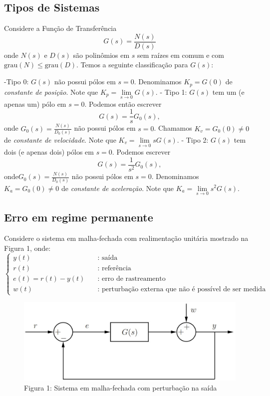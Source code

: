 \documentclass[
]{book}
\begin{document}
\hypertarget{tipos-de-sistemas}{%
\subsection{Tipos de Sistemas}\label{tipos-de-sistemas}}

Considere a Função de Transferência
\[
G(s) = \frac {N(s)}{D(s)}
\]
onde \(N(s)\) e \(D(s)\) são polinômios em \(s\) sem raízes em comum e com \(\text{grau}(N) \leq \text{grau}(D)\). Temos a seguinte classificação para \(G(s)\):

-Tipo 0: \(G(s)\) não possui pólos em \(s=0\). Denominamos \(K_p = G(0)\) de \emph{constante de posição}. Note que \(K_p = \lim\limits_{s \to 0} G(s)\).
- Tipo 1: \(G(s)\) tem um (e apenas um) pólo em \(s=0\). Podemos então escrever
\[
G(s) = \frac {1}{s}G_0(s),
\]
onde \(G_0(s) = \frac {N(s)}{D_0(s)}\) não possui pólos em \(s=0\). Chamamos \(K_v= G_0(0) \neq 0\) de \emph{constante de velocidade}. Note que \(K_v = \lim\limits_{s \to 0} sG(s)\).
- Tipo 2: \(G(s)\) tem dois (e apenas dois) pólos em \(s=0\). Podemos escrever
\[
G(s) = \frac {1}{s^2}G_0(s),
\]
onde\(G_0(s) = \frac {N(s)}{D_0(s)}\) não possui pólos em \(s=0\). Denominamos \(K_a = G_0(0) \neq 0\) de \emph{constante de aceleração}. Note que \(K_a =\lim\limits_{s \to 0} s^2G(s)\).

\hypertarget{erro-em-regime-permanente}{%
\subsection{Erro em regime permanente}\label{erro-em-regime-permanente}}

Considere o sistema em malha-fechada com realimentação unitária mostrado na Figura 1, onde:
\[
\begin{cases}
  y(t) & \quad \text{: saída}\\
  r(t) & \quad \text{: referência}\\
  e(t) = r(t)-y(t) & \quad \text{: erro de rastreamento}\\
  w(t) &\quad \text{: perturbação externa que não é possível de ser medida}
\end{cases}
\]

\begin{figure}
\centering
\includegraphics{Imagens/Lab4/Apresentação/fig1.jpg}
\caption{Figura 1: Sistema em malha-fechada com perturbação na saída}
\end{figure}
\end{document}
